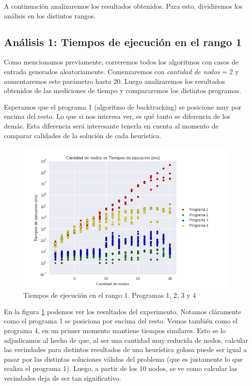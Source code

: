 \par A continuación analizaremos los resultados obtenidos. Para esto, dividiremos los análisis en los distintos rangos.

\subsection{Análisis 1: Tiempos de ejecución en el rango 1}

\par Como mencionamos previamente, correremos todos los algoritmos con casos de entrada generados aleatoriamente. Comenzaremos con \textit{cantidad de nodos} = 2 y aumentaremos este parámetro hasta 20. Luego analizaremos los resultados obtenidos de las mediciones de tiempo y compararemos los distintos programas.

\par Esperamos que el programa 1 (algoritmo de backtracking) se posicione muy por encima del resto. Lo que si nos interesa ver, es qué tanto se diferencia de los demás. Esta diferencia será interesante tenerla en cuenta al momento de comparar calidades de la solución de cada heurística.

\begin{figure}[H]
  \begin{center}
    \includegraphics[width=\textwidth]{img/ejercicio5/tiempos_r1.png}
    \caption{Tiempos de ejecución en el rango 1. Programas 1, 2, 3 y 4}
    \label{fig: ej5_tiempos_r1}
  \end{center}
\end{figure}

\par En la figura \ref{fig: ej5_tiempos_r1} podemos ver los resultados del experimento. Notamos cláramente como el programa 1 se posiciona por encima del resto. Vemos también como el programa 4, en un primer momento mantiene tiempos similares. Esto se lo adjudicamos al hecho de que, al ser una cantidad muy reducida de nodos, calcular las vecindades para distintos resultados de una heurística golosa puede ser igual a pasar por las distintas soluciones válidas del problema (que es justamente lo que realiza el programa 1). Luego, a partir de los 10 nodos, se ve como calcular las vecindades deja de ser tan significativo.

